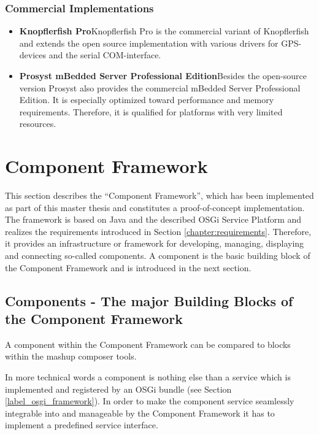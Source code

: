 \subsubsection{Commercial Implementations}

\begin{itemize}
	\item\textbf{Knopflerfish Pro}\newline Knopflerfish Pro is the commercial variant of Knopflerfish
	and extends the open source implementation with various drivers for GPS-devices and the serial
	COM-interface.
	\item\textbf{Prosyst mBedded Server Professional Edition}\newline Besides the open-source version
	Prosyst also provides the commercial mBedded Server Professional Edition. It is especially
	optimized toward performance and memory requirements. Therefore, it is qualified for platforms with
	very limited resources.
\end{itemize}


\section{Component Framework}
\label{sec:component_framework}

This section describes the ``Component Framework'', which has been implemented as part of this
master thesis and constitutes a proof-of-concept implementation. The framework is based on Java and
the described OSGi Service Platform and realizes the requirements introduced in Section
\ref{chapter:requirements}. Therefore, it provides an infrastructure or framework for developing,
managing, displaying and connecting so-called components. A component is the basic building block of
the Component Framework and is introduced in the next section.

\subsection{Components - The major Building Blocks of the Component Framework}
\label{sec:component}

A component within the Component Framework can be compared to blocks within the mashup composer
tools.

In more technical words a component is nothing else than a service which is implemented and
registered by an OSGi bundle (see Section \ref{label_osgi_framework}). In order to make the
component service seamlessly integrable into and manageable by the Component Framework it has to
implement a predefined service interface.


